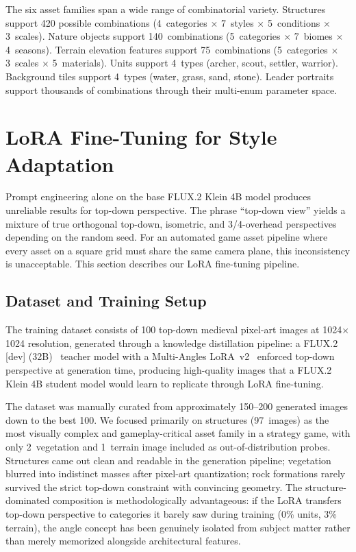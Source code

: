 \documentclass[conference]{IEEEtran}
\begin{document}
The six asset families span a wide range of combinatorial variety.
Structures support 420 possible combinations (4~categories $\times$
7~styles $\times$ 5~conditions $\times$ 3~scales). Nature objects support
140~combinations (5~categories $\times$ 7~biomes $\times$ 4~seasons).
Terrain elevation features support 75~combinations (5~categories $\times$
3~scales $\times$ 5~materials). Units support 4~types (archer, scout,
settler, warrior). Background tiles support 4~types (water, grass, sand, stone). Leader portraits support thousands of combinations through
their multi-enum parameter space.

\FloatBarrier
\section{LoRA Fine-Tuning for Style Adaptation}
\label{sec:lora}

Prompt engineering alone on the base FLUX.2 Klein 4B model produces
unreliable results for top-down perspective. The phrase ``top-down view''
yields a mixture of true orthogonal top-down, isometric, and 3/4-overhead
perspectives depending on the random seed. For an automated game asset
pipeline where every asset on a square grid must share the same camera
plane, this inconsistency is unacceptable. This section describes our LoRA
fine-tuning pipeline.

\subsection{Dataset and Training Setup}

The training dataset consists of 100 top-down medieval pixel-art images at
1024$\times$1024 resolution, generated through a knowledge distillation
pipeline: a FLUX.2 [dev] (32B)~\cite{blackforestlabs2025flux2} teacher model with a Multi-Angles LoRA~v2~\cite{lovis2025multiangles}
enforced top-down perspective at generation time, producing high-quality
images that a FLUX.2 Klein 4B student model would learn to replicate
through LoRA fine-tuning.

The dataset was manually curated from approximately 150--200 generated
images down to the best 100. We focused primarily on structures (97~images)
as the most visually complex and gameplay-critical asset family in a
strategy game, with only 2~vegetation and 1~terrain image included as
out-of-distribution probes. Structures came out clean and readable in the
generation pipeline; vegetation blurred into indistinct masses after
pixel-art quantization; rock formations rarely survived the strict top-down
constraint with convincing geometry. The structure-dominated composition is
methodologically advantageous: if the LoRA transfers top-down perspective to
categories it barely saw during training (0\% units, 3\% terrain), the
angle concept has been genuinely isolated from subject matter rather than
merely memorized alongside architectural features.
\end{document}
